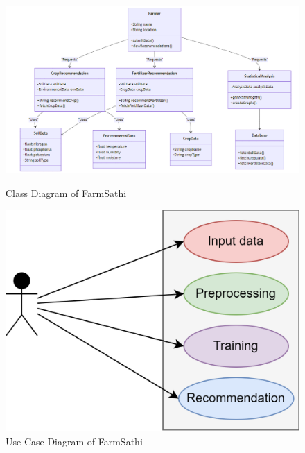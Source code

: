 \documentclass{scrreprt}
\begin{document}
\begin{figure}
    \centering
    \includegraphics[width=1.0\linewidth]{Class Diagram.png}
    \caption{Class Diagram of FarmSathi}
    \label{fig:FarmSathi_Class}
    \vspace{1cm}
    \centering
    \includegraphics[width=0.5\linewidth]{Use_Case_Diagram.png}
    \caption{Use Case Diagram of FarmSathi}
    \label{fig:FarmSathi_Use_Case}
\end{figure}
\end{document}
